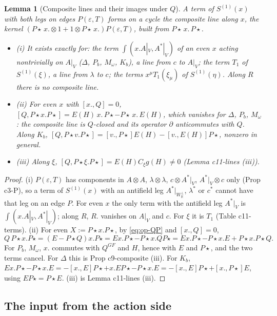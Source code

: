 \documentclass[11pt]{article}
\numberwithin{equation}{section}
\theoremstyle{plain}
\newtheorem{lemma}[theorem]{Lemma}
\theoremstyle{definition}
\newcommand{\AV}{A|_V}
\newcommand{\Pst}{P\star}
\begin{document}
\begin{lemma}[Composite lines and their images under $Q$]
\label{lem:op-lines}
A term of $S^{(1)}(x)$ with both legs on edges $P(\varepsilon,T)$ forms on a cycle the composite line along $x$, the kernel $(\Pst\,x.\otimes1+1\otimes\Pst\,x.)P(\varepsilon,T)$, built from $\Pst\,x.\,\Pst$.
\begin{itemize}
\item (i) It exists exactly for: the term $\int(x.\AV,A^*|_V)$ of an even $x$ acting nontrivially on $\AV$ ($\Delta$, $P_b$, $M_\omega$, $K_b$), a line from $c$ to $\AV$; the term $T_1$ of $S^{(1)}(\xi)$, a line from $\lambda$ to $c$; the terms $x^\mu T_1(\xi_\mu)$ of $S^{(1)}(\eta)$. Along $R$ there is no composite line.
\item (ii) For even $x$ with $[x.,Q]=0$, $[Q,\Pst x.\Pst]=E(H)\,x.\,\Pst-\Pst\,x.\,E(H)$, which vanishes for $\Delta$, $P_b$, $M_\omega$: the composite line is $Q$-closed and its operator $\partial$ anticommutes with $Q$. Along $K_b$, $[Q,\Pst v.\Pst]=[v.,\Pst]E(H)-[v.,E(H)]\Pst$, nonzero in general.
\item (iii) Along $\xi$, $[Q,\Pst\xi.\Pst]=E(H)C_\xi g(H)\ne0$ (Lemma c11-lines (iii)).
\end{itemize}
\end{lemma}

\begin{proof}
(i) $P(\varepsilon,T)$ has components in $A\otimes A$, $\lambda\otimes\lambda$, $c\otimes A^*|_V$, $A^*|_V\otimes c$ only (Prop c3-P), so a term of $S^{(1)}(x)$ with an antifield leg $A^*|_{W_{\mathbb R}^\perp}$, $\lambda^*$ or $c^*$ cannot have that leg on an edge $P$. For even $x$ the only term with the antifield leg $A^*|_V$ is $\int(x.\AV,A^*|_V)$; along $R$, $R.$ vanishes on $\AV$ and $c$. For $\xi$ it is $T_1$ (Table c11-terms). (ii) For even $X:=\Pst x.\Pst$, by \eqref{eq:op-QP} and $[x.,Q]=0$,
\[
Q\,\Pst x.\Pst=(E-\Pst Q)x.\Pst=Ex.\Pst-\Pst x.Q\Pst=Ex.\Pst-\Pst x.E+\Pst x.\Pst Q .
\]
For $P_b$, $M_\omega$, $x.$ commutes with $Q^{GF}$ and $H$, hence with $E$ and $\Pst$, and the two terms cancel. For $\Delta$ this is Prop c9-composite (iii). For $K_b$, $Ex.\Pst-\Pst x.E=-[x.,E]\Pst+x.E\Pst-\Pst x.E=-[x.,E]\Pst+[x.,\Pst]E$, using $E\Pst=\Pst E$. (iii) is Lemma c11-lines (iii).
\end{proof}

\subsection{The input from the action side}
\end{document}
